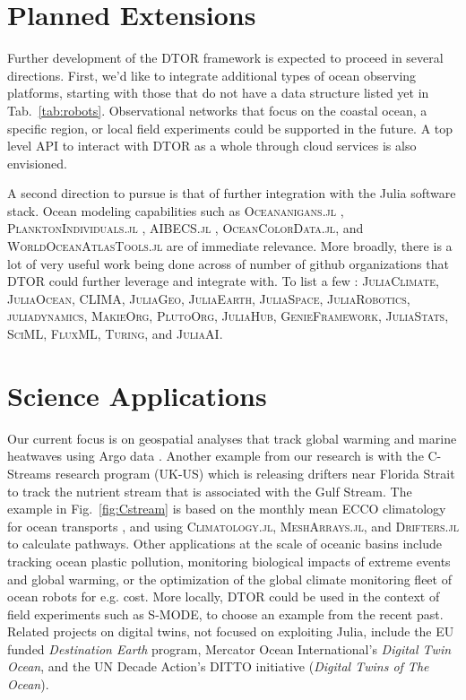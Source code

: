 \documentclass{juliacon}[12pt]
\newcommand{\pkg}[1]{{\small \textsc{#1}}}
\begin{document}
\section{Planned Extensions}

Further development of the DTOR framework is expected to proceed in several directions. First, we'd like to integrate additional types of ocean observing platforms, starting with those that do not have a data structure listed yet in Tab.~\ref{tab:robots}. Observational networks that focus on the coastal ocean, a specific region, or local field experiments could be supported in the future. A top level API to interact with DTOR as a whole through cloud services is also envisioned.

A second direction to pursue is that of further integration with the Julia software stack. Ocean modeling capabilities such as \pkg{Oceananigans.jl} \cite{OceananigansJOSS}, \pkg{PlanktonIndividuals.jl} \cite{Wu2022}, \pkg{AIBECS.jl} \cite{Pasquier2022}, \pkg{OceanColorData.jl}, and \pkg{WorldOceanAtlasTools.jl} are of immediate relevance. More broadly, there is a lot of very useful work being done across of number of github organizations that DTOR could further leverage and integrate with. To list a few : \pkg{JuliaClimate}, \pkg{JuliaOcean}, \pkg{CLIMA}, \pkg{JuliaGeo}, \pkg{JuliaEarth}, \pkg{JuliaSpace}, \pkg{JuliaRobotics}, \pkg{juliadynamics}, \pkg{MakieOrg}, \pkg{PlutoOrg}, \pkg{JuliaHub}, \pkg{GenieFramework}, \pkg{JuliaStats}, \pkg{SciML}, \pkg{FluxML}, \pkg{Turing}, and \pkg{JuliaAI}. 

\section{Science Applications}

Our current focus is on geospatial analyses that track global warming and marine heatwaves using Argo data \cite{Forget2024a}. Another example from our research is with the C-Streams research program (UK-US) which is releasing drifters near Florida Strait to track the nutrient stream that is associated with the Gulf Stream. The example in Fig.~\ref{fig:Cstream} is based on the monthly mean ECCO climatology for ocean transports \cite{Forget2015a,Forget2019,Rousselet2021}, and using \pkg{Climatology.jl}, \pkg{MeshArrays.jl}, and \pkg{Drifters.jl} to calculate pathways. Other applications at the scale of oceanic basins include tracking ocean plastic pollution, monitoring biological impacts of extreme events and global warming, or the optimization of the global climate monitoring fleet of ocean robots for e.g. cost. More locally, DTOR could be used in the context of field experiments such as S-MODE, to choose an example from the recent past. Related projects on digital twins, not focused on exploiting Julia, include the EU funded {\it Destination Earth} program, Mercator Ocean International's {\it Digital Twin Ocean}, and the UN Decade Action's DITTO initiative ({\it Digital Twins of The Ocean}).
\end{document}
